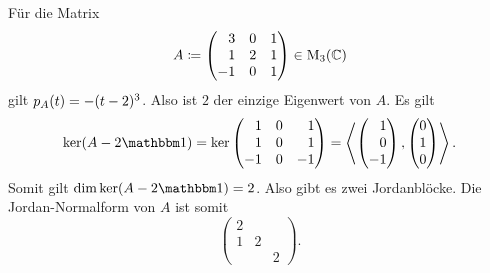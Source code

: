 \begin{example}
  Für die Matrix
  \[
              A
    \coloneqq \begin{pmatrix*}[r]
                 3  & 0 & 1 \\
                 1  & 2 & 1 \\
                -1  & 0 & 1
              \end{pmatrix*}
    \in \matrices{3}{\Complex}
  \]
  gilt $p_{A}(t) = -(t-2)^3$.
  Also ist $2$ der einzige Eigenwert von $A$.
  Es gilt
  \[
      \ker (A - 2\Id)
    = \ker
      \begin{pmatrix*}[r]
         1  & 0 &  1  \\
         1  & 0 &  1  \\
        -1  & 0 & -1
      \end{pmatrix*}
    = \generated{ \rvect{1 \\ 0 \\ -1}, \vect{0 \\ 1 \\ 0} }.
  \]
  Somit gilt $\dim \ker (A - 2\Id) = 2$.
  Also gibt es zwei Jordanblöcke.
  Die Jordan-Normalform von $A$ ist somit
  \[
    \begin{pmatrix}
      2 &   &   \\
      1 & 2 &   \\
        &   & 2
    \end{pmatrix}.
  \]
  

\end{example}
